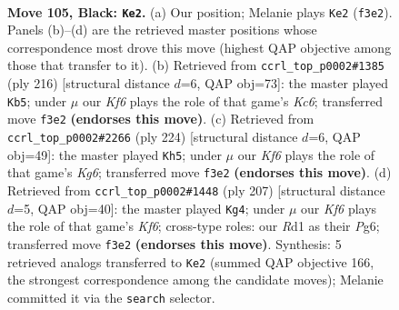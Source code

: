 \documentclass[11pt]{article}
\begin{document}
\clearpage

\begin{figure}[p]\centering
\begin{subfigure}{0.46\textwidth}\centering
\resizebox{\linewidth}{!}{%
\newchessgame
\chessboard[
  setfen={8/8/8/8/8/1R3k1K/5p2/3r4 b - - 25 105},
  showmover=false,
  pgfstyle=straightmove, color=movearrow, markmove={f3-e2}
]}
\caption{}
\end{subfigure}\hfill
\begin{subfigure}{0.46\textwidth}\centering
\resizebox{\linewidth}{!}{%
\newchessgame
\chessboard[
  setfen={8/4kp2/1PK5/8/8/3R4/2r5/8 w - - 5 109},
  showmover=false,
  pgfstyle=straightmove, color=movearrow, markmove={c6-b5}
]}
\caption{}
\end{subfigure}
\\[4pt]
\begin{subfigure}{0.46\textwidth}\centering
\resizebox{\linewidth}{!}{%
\newchessgame
\chessboard[
  setfen={6k1/1R6/r5K1/6P1/8/6P1/8/8 w - - 21 113},
  showmover=false,
  pgfstyle=straightmove, color=movearrow, markmove={g6-h5}
]}
\caption{}
\end{subfigure}\hfill
\begin{subfigure}{0.46\textwidth}\centering
\resizebox{\linewidth}{!}{%
\newchessgame
\chessboard[
  setfen={8/6n1/6p1/8/8/5kp1/3K4/5R2 b - - 11 104},
  showmover=false,
  pgfstyle=straightmove, color=movearrow, markmove={f3-g4}
]}
\caption{}
\end{subfigure}
\caption{\textbf{Move 105, Black: \texttt{Ke2}.} (a) Our position; Melanie plays \texttt{Ke2} (\texttt{f3e2}). Panels (b)--(d) are the retrieved master positions whose correspondence most drove this move (highest QAP objective among those that transfer to it). (b) Retrieved from \texttt{ccrl\_top\_p0002\#1385} (ply 216) [structural distance $d$=6, QAP obj=73]: the master played \texttt{Kb5}; under $\mu$ our \emph{Kf6} plays the role of that game's \emph{Kc6}; transferred move \texttt{f3e2} \textbf{(endorses this move)}. (c) Retrieved from \texttt{ccrl\_top\_p0002\#2266} (ply 224) [structural distance $d$=6, QAP obj=49]: the master played \texttt{Kh5}; under $\mu$ our \emph{Kf6} plays the role of that game's \emph{Kg6}; transferred move \texttt{f3e2} \textbf{(endorses this move)}. (d) Retrieved from \texttt{ccrl\_top\_p0002\#1448} (ply 207) [structural distance $d$=5, QAP obj=40]: the master played \texttt{Kg4}; under $\mu$ our \emph{Kf6} plays the role of that game's \emph{Kf6}; cross-type roles: our \emph{R}d1 as their \emph{P}g6; transferred move \texttt{f3e2} \textbf{(endorses this move)}. Synthesis: 5 retrieved analogs transferred to \texttt{Ke2} (summed QAP objective 166, the strongest correspondence among the candidate moves); Melanie committed it via the \texttt{search} selector.}
\label{fig:thought-m209}
\end{figure}
\end{document}
